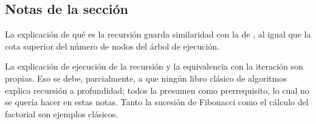 \subsection*{Notas de la sección}

La explicación de qué es la recursión guarda similaridad con la de \textcite{leetcode_recursion}, al igual que la cota superior del número de nodos del árbol de ejecución.

La explicación de ejecución de la recursión y la equivalencia con la iteración son propias. Eso se debe, parcialmente, a que ningún libro clásico de algoritmos explica recursión a profundidad; todos la presumen como prerrequisito, lo cual no se quería hacer en estas notas. Tanto la sucesión de Fibonacci como el cálculo del factorial son ejemplos clásicos.
